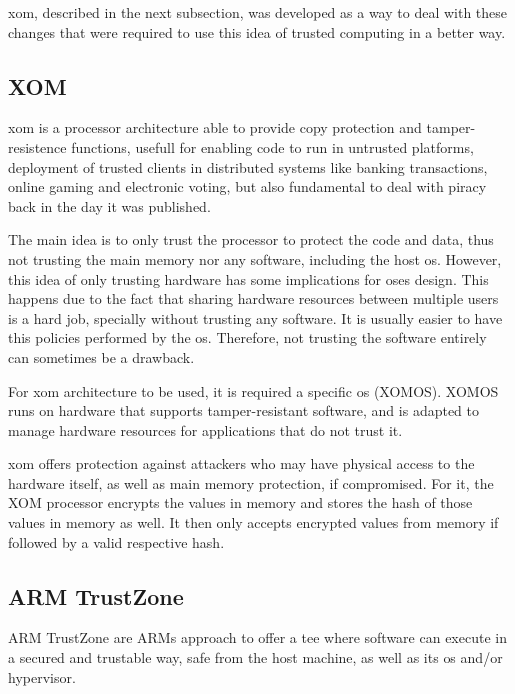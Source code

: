 \gls{xom}, described in the next subsection, was developed as a way to deal with these changes that were required to use this idea of trusted computing in a better way.

\subsection{XOM}
\label{ssec:xom}

\gls{xom} \cite{xomPaper} is a processor architecture able to provide copy protection and tamper-resistence functions, 
usefull for enabling code to run in untrusted platforms, deployment of trusted clients in distributed systems like banking transactions, online gaming and electronic voting, but also fundamental to deal with piracy back in the day it was published. 

The main idea is to only trust the processor to protect the code and data, thus not trusting the main memory nor any software, including the host \gls{os}.
However, this idea of only trusting hardware has some implications for \gls{os}es design. This happens due to the fact that sharing hardware resources between multiple users is a hard job, specially without trusting any software. It is usually easier to have this policies performed by the \gls{os}. Therefore, not trusting the software entirely can sometimes be a drawback.  

For \gls{xom} architecture to be used, it is required a specific \gls{os} (XOMOS). XOMOS runs on hardware that supports tamper-resistant software, and is adapted to manage hardware resources for applications that do not trust it.

\gls{xom} offers protection against attackers who may have physical access to the hardware itself, as well as main memory protection, if compromised. For it, the XOM processor encrypts the values in memory and stores the hash of those values in memory as well. It then only accepts encrypted values from memory if followed by a valid respective hash. 



\subsection{ARM TrustZone}
\label{ssec:armtz}

ARM TrustZone \cite{armTZPaper} are ARMs approach to offer a \gls{tee} where software can execute in a secured and trustable way, safe from the host machine, as well as its \gls{os} and/or hypervisor. 

